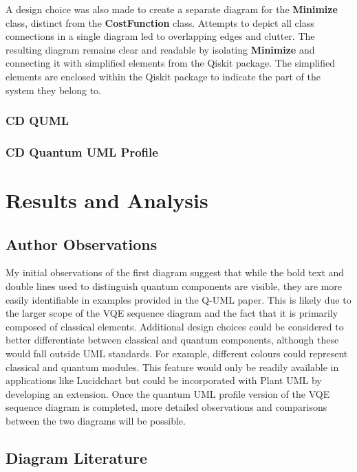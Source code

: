 \documentclass{article}
\begin{document}
A design choice was also made to create a separate diagram for the \textbf{Minimize} class, distinct from the \textbf{CostFunction} class. Attempts to depict all class connections in a single diagram led to overlapping edges and clutter. The resulting diagram remains clear and readable by isolating \textbf{Minimize} and connecting it with simplified elements from the Qiskit package. The simplified elements are enclosed within the Qiskit package to indicate the part of the system they belong to.

\subsubsection{CD QUML}
\subsubsection{CD Quantum UML Profile}

\section{Results and Analysis}

\subsection{Author Observations}

My initial observations of the first diagram suggest that while the bold text and double lines used to distinguish quantum components are visible, they are more easily identifiable in examples provided in the Q-UML paper. This is likely due to the larger scope of the VQE sequence diagram and the fact that it is primarily composed of classical elements.
Additional design choices could be considered to better differentiate between classical and quantum components, although these would fall outside UML standards. For example, different colours could represent classical and quantum modules. This feature would only be readily available in applications like Lucidchart but could be incorporated with Plant UML by developing an extension.
Once the quantum UML profile version of the VQE sequence diagram is completed, more detailed observations and comparisons between the two diagrams will be possible.

\subsection{Diagram Literature}
\end{document}
